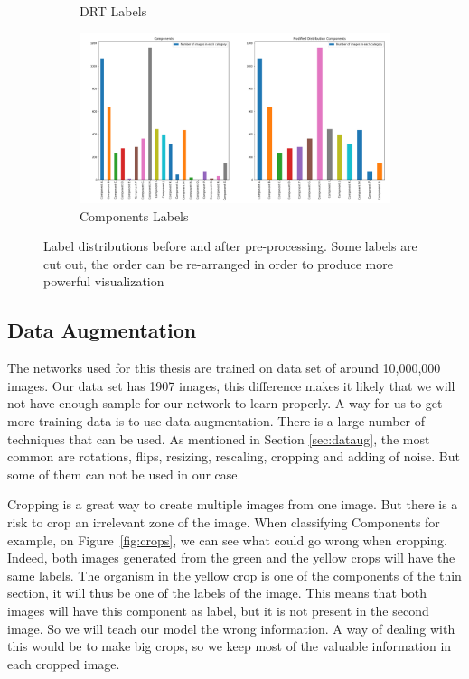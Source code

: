 \begin{figure}
\begin{subfigure}{.6\textwidth}
  \caption{DRT Labels}
  \label{fig:drtlab}
\end{subfigure}%
\begin{subfigure}{.6\textwidth}
  \centering
  \includegraphics[width=1\linewidth]{figures/03-Components.PNG}
  \caption{Components Labels}
  \label{fig:compolab}
\end{subfigure}
\caption[Pre processing of labels]{Label distributions before and after pre-processing. Some labels are cut out,  the order can be re-arranged in order to produce more powerful visualization}
\label{fig:labelsdistrib}
\end{figure}

\subsection{Data Augmentation}
The networks used for this thesis are trained on data set of around 10,000,000 images. Our data set has 1907 images, this difference makes it likely that we will not have enough sample for our network to learn properly. A way for us to get more training data is to use data augmentation.  There is a  large number of techniques that can be used. As mentioned in Section \ref{sec:dataug}, the most common are rotations, flips, resizing, rescaling, cropping and adding of noise. But some of them can not be used in our case. 

Cropping is a great way to create multiple images from one image. But there is a risk to crop an irrelevant zone of the image. When classifying Components for example, on Figure~\ref{fig:crops}, we can see what could go wrong when cropping. Indeed, both images generated from the green and the yellow crops will have the same labels. The organism in the yellow crop is one of the components of the thin section, it will thus be one of the labels of the image. This means that both images will have this component as label, but it is not present in the second image. So we will teach our model the wrong information. A way of dealing with this would be to make big crops, so we keep most of the valuable information in each cropped image.  


